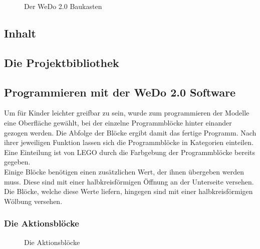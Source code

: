 \begin{figure}[htbp!]
	\centering
	\caption[Der WeDo 2.0 Baukasten]{Der WeDo 2.0 Baukasten} %
	\label{img:lego-education-wedo-20}
\end{figure} 

\subsection{Inhalt}

\subsection{Die Projektbibliothek}\label{Projektbibliothek}

\subsection{Programmieren mit der WeDo 2.0 Software}
Um für Kinder leichter greifbar zu sein, wurde zum programmieren der Modelle eine Oberfläche gewählt, bei der einzelne Programmblöcke hinter einander gezogen werden. Die Abfolge der Blöcke ergibt damit das fertige Programm. Nach ihrer jeweiligen Funktion lassen sich die Programmblöcke in Kategorien einteilen. Eine Einteilung ist von LEGO durch die Farbgebung der Programmblöcke bereits gegeben. \\
Einige Blöcke benötigen einen zusätzlichen Wert, der ihnen übergeben werden muss. Diese sind mit einer halbkreisförmigen Öffnung an der Unterseite versehen. Die Blöcke, welche diese Werte liefern, hingegen sind mit einer halbkreisförmigen Wölbung versehen. 

\subsubsection{Die Aktionsblöcke}
\begin{figure}[htbp!]
	\centering
	\caption[Die Aktionsblöcke]{Die Aktionsblöcke} %
	\label{img:Aktionsblöcke}
\end{figure}

